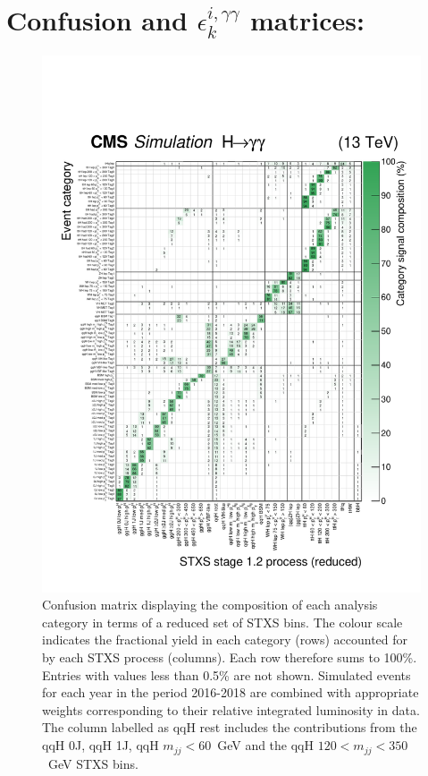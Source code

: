 \chapter{Confusion and $\epsilon^{i,\gamma\gamma}_k$ matrices: \Hgg}\label{app:eff_acc}

\begin{figure}[hptb]
  \centering
  \includegraphics[width=1\textwidth]{Figures/hgg_overview/purityMatrix_thesis.pdf}
  \caption[Confusion matrix for the full set of analysis categories]
  {
    Confusion matrix displaying the composition of each analysis category in terms of a reduced set of STXS bins. The colour scale indicates the fractional yield in each category (rows) accounted for by each STXS process (columns). Each row therefore sums to 100\%. Entries with values less than 0.5\% are not shown. Simulated events for each year in the period 2016-2018 are combined with appropriate weights corresponding to their relative integrated luminosity in data. The column labelled as qqH rest includes the contributions from the qqH 0J, qqH 1J, qqH $m_{jj}<60$~GeV and the qqH $120<m_{jj}<350$~GeV STXS bins.
  }
  \label{fig:purity_matrix}
\end{figure}

